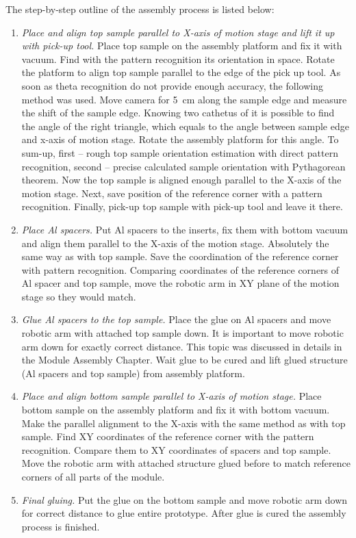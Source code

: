 The step-by-step outline of the assembly process is listed below:

\begin{enumerate}
\setlength\itemsep{-0.5em}
\item \textit{Place and align top sample parallel to X-axis of motion stage and lift it up with pick-up tool.} Place top sample on the assembly platform and fix it with vacuum. Find with the pattern recognition its orientation in space. Rotate the platform to align top sample parallel to the edge of the pick up tool. As soon as theta recognition do not provide enough accuracy, the following method was used. Move camera for 5~cm along the sample edge and measure the shift of the sample edge. Knowing two cathetus of it is possible to find the angle of the right triangle, which equals to the angle between sample edge and x-axis of motion stage. Rotate the assembly platform for this angle. To sum-up, first -- rough top sample orientation estimation with direct pattern recognition, second -- precise calculated sample orientation with Pythagorean theorem. Now the top sample is aligned enough parallel to the X-axis of the motion stage. Next, save position of the reference corner with a pattern recognition. Finally, pick-up top sample with pick-up tool and leave it there.
\item \textit{Place Al spacers.} Put Al spacers to the inserts, fix them with bottom vacuum and align them parallel to the X-axis of the motion stage. Absolutely the same way as with top sample. Save the coordination of the reference corner with pattern recognition. Comparing coordinates of the reference corners of Al spacer and top sample, move the robotic arm in XY plane of the motion stage so they would match.
\item \textit{Glue Al spacers to the top sample.} Place the glue on Al spacers and move robotic arm with attached top sample down. It is important to move robotic arm down for exactly correct distance. This topic was discussed in details in the Module Assembly Chapter. Wait glue to be cured and lift glued structure (Al spacers and top sample) from assembly platform.
\item \textit{Place and align bottom sample parallel to X-axis of motion stage.} Place bottom sample on the assembly platform and fix it with bottom vacuum. Make the parallel alignment to the X-axis with the same method as with top sample. Find XY coordinates of the reference corner with the pattern recognition. Compare them to XY coordinates of spacers and top sample. Move the robotic arm with attached structure glued before to match reference corners of all parts of the module.
\item \textit{Final gluing.} Put the glue on the bottom sample and move robotic arm down for correct distance to glue entire prototype. After glue is cured the assembly process is finished.
\end{enumerate}

